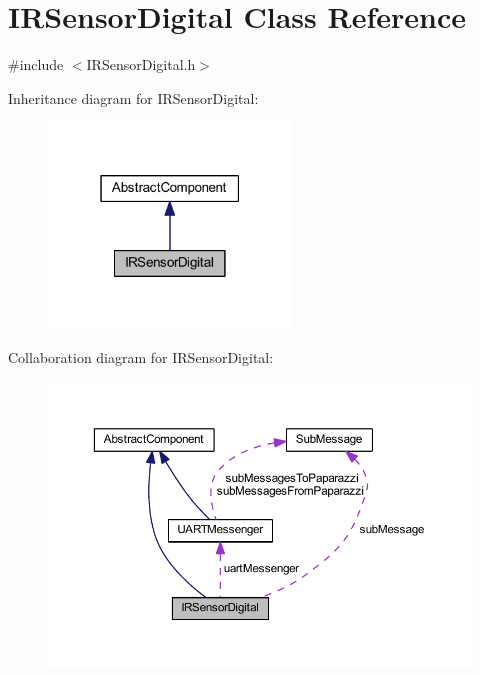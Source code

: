 \hypertarget{class_i_r_sensor_digital}{}\section{I\+R\+Sensor\+Digital Class Reference}
\label{class_i_r_sensor_digital}


{\ttfamily \#include $<$I\+R\+Sensor\+Digital.\+h$>$}



Inheritance diagram for I\+R\+Sensor\+Digital\+:\nopagebreak
\begin{figure}[H]
\begin{center}
\leavevmode
\includegraphics[width=183pt]{class_i_r_sensor_digital__inherit__graph}
\end{center}
\end{figure}


Collaboration diagram for I\+R\+Sensor\+Digital\+:\nopagebreak
\begin{figure}[H]
\begin{center}
\leavevmode
\includegraphics[width=350pt]{class_i_r_sensor_digital__coll__graph}
\end{center}
\end{figure}
